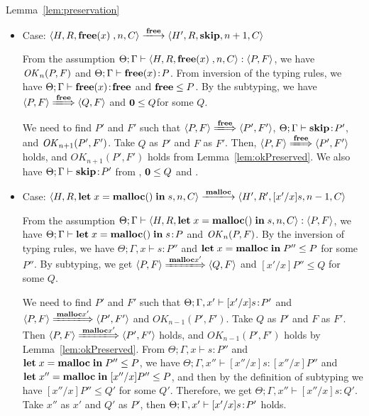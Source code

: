 \begin{pfof}{Lemma~\ref{lem:preservation}}
\begin{itemize}
\item Case: \(\langle H, R, \FREE, n, C\rangle \xlongrightarrow{\Free}
  \langle H', R, \SKIP, n + 1, C \rangle \)

  From the assumption \( \Theta; \Gamma \vdash \langle H, R, \mathbf{free}(x)\;, n,
  C \rangle : \langle P, F \rangle\), we have \(\mathit{OK}_n(P, F)\) and
  \(\Theta; \Gamma \vdash \mathbf{free}(x) \!:\! P\).  From inversion of the
  typing rules, we have \(\Theta; \Gamma \vdash \mathbf{free}(x) \!:\! \mathbf{free}\)
  and \(\mathbf{free} \le P\). By the subtyping, we have \( \langle P, F
  \rangle \xLongrightarrow{\Free} \langle Q, F \rangle\) and \(\mathbf{0}
  \le Q \)for some \(Q\).

  We need to find \(P'\) and \(F'\) such that \( \langle P, F \rangle
  \xLongrightarrow{\Free} \langle P', F' \rangle \), \(\Theta; \Gamma
  \vdash \mathbf{skip} \!:\! P'\), and \(\mathit{OK}_{n+1}(P', F')\).  Take \(Q\) as
  \(P'\) and \(F\) as \(F'\).  Then, \( \langle P, F \rangle
  \xLongrightarrow{\Free} \langle P', F' \rangle \) holds, and
  \(OK_{n+1}(P', F')\) holds from Lemma~\ref{lem:okPreserved}.  We
  also have \(\Theta; \Gamma \vdash \mathbf{skip} \!:\! P'\) from ,
  \(\mathbf{0} \le Q\) and .

\item Case: \( \langle H, R, \LET x = \MALLOC \IN s, n, C\rangle
  \xlongrightarrow{\Malloc} \langle H', R', [x'/x]s, n - 1, C \rangle \)

  From the assumption \( \Theta; \Gamma \vdash \langle H, R, \mathbf{let}\; x =
  \mathbf{malloc()}\; \mathbf{in}\; s, n, C \rangle : \langle P, F \rangle\), we have
  \(\Theta; \Gamma \vdash \mathbf{let}\; x = \mathbf{malloc()}\; \mathbf{in}\; s \!:\! P\) and
  \(\mathit{OK}_{n}(P, F)\). By the inversion of typing rules, we have
  \(\Theta; \Gamma, x \vdash s : P'' \) and \( \mathbf{let}\; x = \mathbf{malloc} \; \mathbf{in}\;
  P'' \le P \) for some \(P''\). By subtyping, we get \( \langle P, F
  \rangle \xLongrightarrow{\Malloc{x'}} \langle Q, F \rangle \) and \( [x'/x]P''
  \le Q\) for some \(Q\).

  We need to find \(P'\) and \(F'\) such that \(\Theta;\Gamma, x'
  \vdash [x'/x]s\!:\! P'\) and \( \langle P, F \rangle
  \xLongrightarrow{\Malloc{x'}} \langle P', F' \rangle\) and
  \(OK_{n-1}(P', F')\). Take \(Q\) as \(P'\) and \(F\) as \(F'\).
  Then \( \langle P, F \rangle \xLongrightarrow{\Malloc{x'}} \langle
  P', F' \rangle\) holds, and \(OK_{n-1}(P', F')\) holds by
  Lemma~\ref{lem:okPreserved}. From \(\Theta; \Gamma, x \vdash s :
  P''\) and \(\mathbf{let}\; x = \mathbf{malloc} \; \mathbf{in}\; P'' \le P\), we have \(\Theta;
  \Gamma, x'' \vdash [x''/x]s : [x''/x]P''\) and \(\mathbf{let}\; x'' = \mathbf{malloc}
  \; \mathbf{in}\; [x''/x]P'' \le P\), and then by the definition of subtyping
  we have \([x''/x]P'' \le Q'\) for some \(Q'\). Therefore, we get
  \(\Theta; \Gamma, x'' \vdash [x''/x]s : Q'\). Take \(x''\) as \(x'\)
  and \(Q'\) as \(P'\), then \(\Theta;\Gamma, x' \vdash
  [x'/x]s\!:\! P'\) holds.
      

\end{itemize}
\end{pfof}
